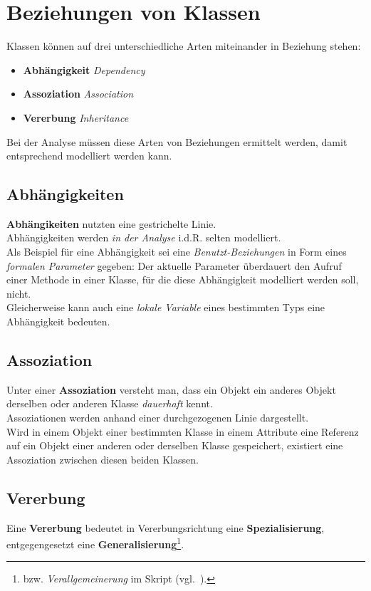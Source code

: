 \section{Beziehungen von Klassen}\label{sec:beziehungen-von-klassen}

Klassen können auf drei unterschiedliche Arten miteinander in Beziehung stehen:

\begin{itemize}
    \item \textbf{Abhängigkeit} \textit{Dependency}
    \item \textbf{Assoziation} \textit{Association}
    \item \textbf{Vererbung} \textit{Inheritance}
\end{itemize}

\noindent
Bei der Analyse müssen diese Arten von Beziehungen ermittelt werden, damit entsprechend modelliert werden kann.\\

\subsection*{Abhängigkeiten}
\textbf{Abhängikeiten} nutzten eine gestrichelte Linie.\\
Abhängigkeiten werden \textit{in der Analyse} i.d.R. selten modelliert.\\
Als Beispiel für eine Abhängigkeit sei eine \textit{Benutzt-Beziehungen} in Form eines \textit{formalen Parameter} gegeben: Der aktuelle Parameter überdauert den Aufruf einer Methode in einer Klasse, für die diese Abhängigkeit modelliert werden soll, nicht.\\
Gleicherweise kann auch eine \textit{lokale Variable} eines bestimmten Typs eine Abhängigkeit bedeuten.

\subsection*{Assoziation}
Unter einer \textbf{Assoziation} versteht man, dass ein Objekt ein anderes Objekt derselben oder anderen Klasse \textit{dauerhaft} kennt.\\
Assoziationen werden anhand einer durchgezogenen Linie dargestellt.\\
Wird in einem Objekt einer bestimmten Klasse in einem Attribute eine Referenz auf ein Objekt einer anderen oder derselben Klasse gespeichert, existiert eine Assoziation zwischen diesen beiden Klassen.

\subsection*{Vererbung}
Eine \textbf{Vererbung} bedeutet in Vererbungsrichtung eine \textbf{Spezialisierung}, entgegengesetzt eine \textbf{Generalisierung}\footnote{
bzw. \textit{Verallgemeinerung} im Skript (vgl.~\cite[7]{Wed09b}).
}.

